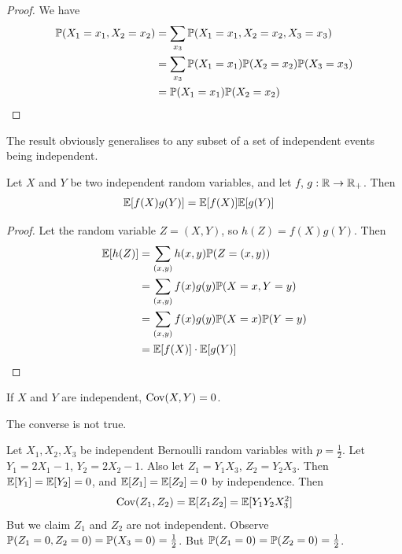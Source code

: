 \documentclass{../template/note}
\begin{document}
    \begin{proof}
        We have
        \begin{align*}
            \mathbb P(X_1 = x_1, X_2 = x_2) &= \sum_{x_3} \mathbb P(X_1 = x_1, X_2 = x_2, X_3 = x_3) \\
            &= \sum_{x_3} \mathbb P(X_1 = x_1) \mathbb P(X_2 = x_2) \mathbb P(X_3 = x_3) \\
            &= \mathbb P(X_1 = x_1)\mathbb P(X_2 = x_2)
        \end{align*}
    \end{proof}
    
    \begin{remark*}
        The result obviously generalises to any subset of a set of independent events being independent.
    \end{remark*}
    
    \begin{lemma}
        Let \(X\) and \(Y\) be two independent random variables, and let \(f\), \(g: \mathbb R \to \mathbb R_{+}\). Then
        \begin{align*}
            \mathbb E[f(X)g(Y)] &= \mathbb E[f(X)]\mathbb E[g(Y)]
        \end{align*}
    \end{lemma}
    
    \begin{proof}
        Let the random variable \(Z = (X, Y)\), so \(h(Z) = f(X)g(Y)\). Then
        \begin{align*}
            \mathbb E[h(Z)] &= \sum_{(x, y)}h(x, y) \mathbb P(Z = (x, y)) \\
            &= \sum_{(x, y)}f(x)g(y) \mathbb P(X = x, Y = y) \\
            &= \sum_{(x, y)}f(x)g(y) \mathbb P(X = x)\mathbb P(Y = y) \\
            &= \mathbb E[f(X)] \cdot \mathbb E[g(Y)]
        \end{align*}
    \end{proof}
    
    \begin{proposition}
        If \(X\) and \(Y\) are independent, \(\operatorname{Cov}(X, Y) = 0\).
    \end{proposition}
    
    \begin{remark*}
        The converse is not true.
    \end{remark*}
    
    \begin{example}
        Let \(X_1, X_2, X_3\) be independent Bernoulli random variables with \(p=\frac{1}{2}\). Let \(Y_1 = 2X_1-1\), \(Y_2 = 2X_2-1\). Also let \(Z_1 = Y_1X_3\), \(Z_2 = Y_2X_3\). Then \(\mathbb E[Y_1] = \mathbb E[Y_2] = 0\), and \(\mathbb E[Z_1] = \mathbb E[Z_2] = 0\) by independence. Then
        \begin{align*}
            \operatorname{Cov}(Z_1, Z_2) = \mathbb E[Z_1Z_2] = \mathbb E[Y_1Y_2X_3^2]
        \end{align*}
        But we claim \(Z_1\) and \(Z_2\) are not independent. Observe \(\mathbb P(Z_1 = 0, Z_2 = 0) = \mathbb P(X_3 = 0) = \frac{1}{2}\). But \(\mathbb P(Z_1 = 0) = \mathbb P(Z_2 = 0) = \frac 1 2\).
    \end{example}
    
\end{document}
